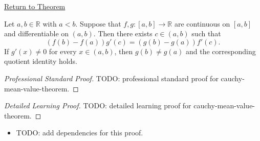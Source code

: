 \newpage
{}
\label{prf:cauchy-mean-value-theorem}

\begin{remark*}[Return]
\hyperref[thm:cauchy-mean-value-theorem]{Return to Theorem}
\end{remark*}

\begin{theorem*}
Let \(a,b\in\mathbb{R}\) with \(a<b\). Suppose that \(f,g:[a,b]\to\mathbb{R}\) are continuous on \([a,b]\) and differentiable on \((a,b)\). Then there exists \(c\in(a,b)\) such that
\[
  (f(b)-f(a))g'(c)=(g(b)-g(a))f'(c).
\]
If \(g'(x)\neq 0\) for every \(x\in(a,b)\), then \(g(b)\neq g(a)\) and the corresponding quotient identity holds.
\end{theorem*}

\begin{proof}[Professional Standard Proof]
\LRAProofBodyStart
TODO: professional standard proof for cauchy-mean-value-theorem.
\end{proof}

\begin{proof}[Detailed Learning Proof]
\LRAProofBodyStart
TODO: detailed learning proof for cauchy-mean-value-theorem.
\end{proof}

\begin{remark*}
\end{remark*}

\begin{dependencies}
\begin{itemize}
  \item TODO: add dependencies for this proof.
\end{itemize}
\end{dependencies}

\clearpage
